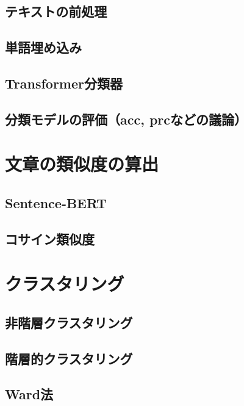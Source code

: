 \documentclass[12pt,a4j]{jreport}
\begin{document}
\subsection{テキストの前処理}


\subsection{単語埋め込み}


\subsection{Transformer分類器}


\subsection{分類モデルの評価（acc, prcなどの議論）}


\section{文章の類似度の算出}


\subsection{Sentence-BERT}


\subsection{コサイン類似度}


\section{クラスタリング}


\subsection{非階層クラスタリング}


\subsection{階層的クラスタリング}


\subsection{Ward法}
\end{document}
